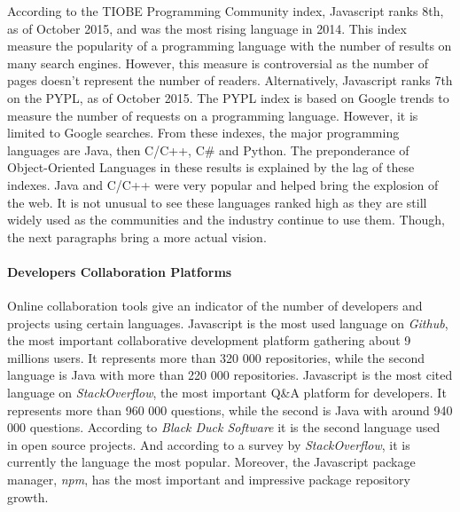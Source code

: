 According to the TIOBE Programming Community index, Javascript ranks 8th, as of October 2015, and was the most rising language in 2014.
This index measure the popularity of a programming language with the number of results on many search engines.
However, this measure is controversial as the number of pages doesn't represent the number of readers.
Alternatively, Javascript ranks 7th on the PYPL, as of October 2015.
The PYPL index is based on Google trends to measure the number of requests on a programming language.
However, it is limited to Google searches.
From these indexes, the major programming languages are Java, then C/C++, C\# and Python.
The preponderance of Object-Oriented Languages in these results is explained by the lag of these indexes.
Java and C/C++ were very popular and helped bring the explosion of the web.
It is not unusual to see these languages ranked high as they are still widely used as the communities and the industry continue to use them.
Though, the next paragraphs bring a more actual vision.


\paragraph{Developers Collaboration Platforms}

Online collaboration tools give an indicator of the number of developers and projects using certain languages.
Javascript is the most used language on \textit{Github}, the most important collaborative development platform gathering about 9 millions users.
It represents more than 320 000 repositories, while the second language is Java with more than 220 000 repositories.
Javascript is the most cited language on \textit{StackOverflow}, the most important Q\&A platform for developers.
It represents more than 960 000 questions, while the second is Java with around 940 000 questions.
According to \textit{Black Duck Software} it is the second language used in open source projects.
And according to a survey by \textit{StackOverflow}, it is currently the language the most popular.
Moreover, the Javascript package manager, \textit{npm}, has the most important and impressive package repository growth.

